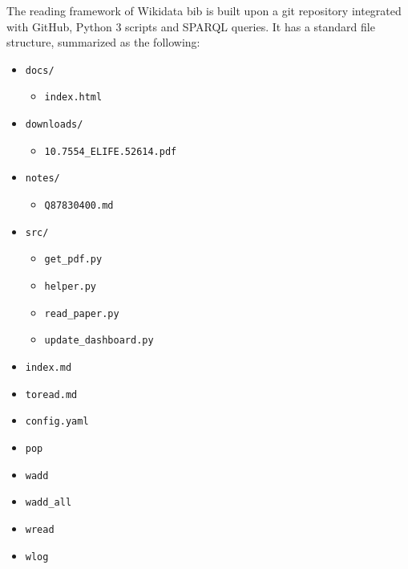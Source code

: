 The reading framework of Wikidata bib is built upon a git repository integrated with GitHub, Python 3 scripts and SPARQL queries.
It has a standard file structure, summarized as the following:

\begin{itemize}
\tightlist
\item
  \texttt{docs/}

  \begin{itemize}
  \tightlist
  \item
    \texttt{index.html}
  \end{itemize}
\item
  \texttt{downloads/}

  \begin{itemize}
  \tightlist
  \item
    \texttt{10.7554\_ELIFE.52614.pdf}
  \end{itemize}
\item
  \texttt{notes/}

  \begin{itemize}
  \tightlist
  \item
    \texttt{Q87830400.md}
  \end{itemize}
\item
  \texttt{src/}

  \begin{itemize}
  \tightlist
  \item
    \texttt{get\_pdf.py}
  \item
    \texttt{helper.py}
  \item
    \texttt{read\_paper.py}
  \item
    \texttt{update\_dashboard.py}
  \end{itemize}
\item
  \texttt{index.md}
\item
  \texttt{toread.md}
\item
  \texttt{config.yaml}
\item
  \texttt{pop}
\item
  \texttt{wadd}
\item
  \texttt{wadd\_all}
\item
  \texttt{wread}
\item
  \texttt{wlog}
\end{itemize}


